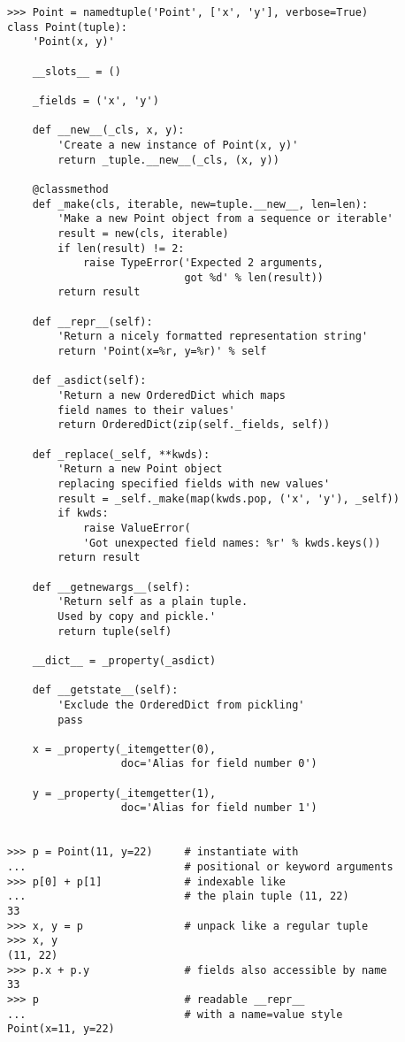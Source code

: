 \begin{verbatim}
>>> Point = namedtuple('Point', ['x', 'y'], verbose=True)
class Point(tuple):
    'Point(x, y)'

    __slots__ = ()

    _fields = ('x', 'y')

    def __new__(_cls, x, y):
        'Create a new instance of Point(x, y)'
        return _tuple.__new__(_cls, (x, y))

    @classmethod
    def _make(cls, iterable, new=tuple.__new__, len=len):
        'Make a new Point object from a sequence or iterable'
        result = new(cls, iterable)
        if len(result) != 2:
            raise TypeError('Expected 2 arguments,
                            got %d' % len(result))
        return result

    def __repr__(self):
        'Return a nicely formatted representation string'
        return 'Point(x=%r, y=%r)' % self

    def _asdict(self):
        'Return a new OrderedDict which maps
        field names to their values'
        return OrderedDict(zip(self._fields, self))

    def _replace(_self, **kwds):
        'Return a new Point object
        replacing specified fields with new values'
        result = _self._make(map(kwds.pop, ('x', 'y'), _self))
        if kwds:
            raise ValueError(
            'Got unexpected field names: %r' % kwds.keys())
        return result

    def __getnewargs__(self):
        'Return self as a plain tuple.
        Used by copy and pickle.'
        return tuple(self)

    __dict__ = _property(_asdict)

    def __getstate__(self):
        'Exclude the OrderedDict from pickling'
        pass

    x = _property(_itemgetter(0),
                  doc='Alias for field number 0')

    y = _property(_itemgetter(1),
                  doc='Alias for field number 1')


>>> p = Point(11, y=22)     # instantiate with 
...                         # positional or keyword arguments
>>> p[0] + p[1]             # indexable like 
...                         # the plain tuple (11, 22)
33
>>> x, y = p                # unpack like a regular tuple
>>> x, y
(11, 22)
>>> p.x + p.y               # fields also accessible by name
33
>>> p                       # readable __repr__ 
...                         # with a name=value style
Point(x=11, y=22)
\end{verbatim}